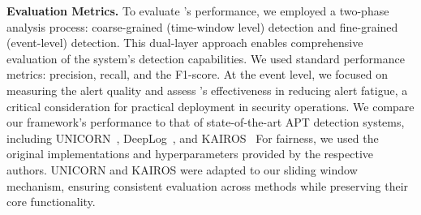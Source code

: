 \noindent\textbf{Evaluation Metrics.}
To evaluate \method's performance, we employed a two-phase analysis process: coarse-grained (time-window level) detection and fine-grained (event-level) detection. 
This dual-layer approach enables comprehensive evaluation of the system's detection capabilities.
We used standard performance metrics: precision, recall, and the F1-score. 
At the event level, we focused on measuring the alert quality and assess \method's effectiveness in reducing alert fatigue, a critical consideration for practical deployment in security operations.
We compare our framework's performance to that of state-of-the-art APT detection systems, including UNICORN~\cite{han2020unicorn}, DeepLog~\cite{du2017deeplog}, and KAIROS~\cite{cheng2023kairospracticalintrusiondetection}
For fairness, we used the original implementations and hyperparameters provided by the respective authors. 
UNICORN and KAIROS were adapted to our sliding window mechanism, ensuring consistent evaluation across methods while preserving their core functionality.